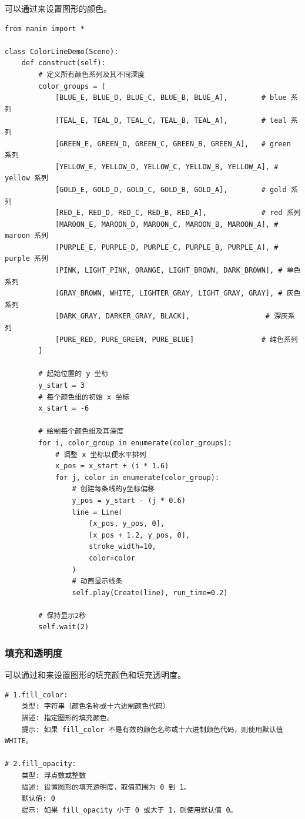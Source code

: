 可以通过来设置图形的颜色。

\begin{lstlisting}[style=pythonstyle]
from manim import *

class ColorLineDemo(Scene):
    def construct(self):
        # 定义所有颜色系列及其不同深度
        color_groups = [
            [BLUE_E, BLUE_D, BLUE_C, BLUE_B, BLUE_A],        # blue 系列
            [TEAL_E, TEAL_D, TEAL_C, TEAL_B, TEAL_A],        # teal 系列
            [GREEN_E, GREEN_D, GREEN_C, GREEN_B, GREEN_A],   # green 系列
            [YELLOW_E, YELLOW_D, YELLOW_C, YELLOW_B, YELLOW_A], # yellow 系列
            [GOLD_E, GOLD_D, GOLD_C, GOLD_B, GOLD_A],        # gold 系列
            [RED_E, RED_D, RED_C, RED_B, RED_A],             # red 系列
            [MAROON_E, MAROON_D, MAROON_C, MAROON_B, MAROON_A], # maroon 系列
            [PURPLE_E, PURPLE_D, PURPLE_C, PURPLE_B, PURPLE_A], # purple 系列
            [PINK, LIGHT_PINK, ORANGE, LIGHT_BROWN, DARK_BROWN], # 单色系列
            [GRAY_BROWN, WHITE, LIGHTER_GRAY, LIGHT_GRAY, GRAY], # 灰色系列
            [DARK_GRAY, DARKER_GRAY, BLACK],                  # 深灰系列
            [PURE_RED, PURE_GREEN, PURE_BLUE]                # 纯色系列
        ]

        # 起始位置的 y 坐标
        y_start = 3
        # 每个颜色组的初始 x 坐标
        x_start = -6

        # 绘制每个颜色组及其深度
        for i, color_group in enumerate(color_groups):
            # 调整 x 坐标以便水平排列
            x_pos = x_start + (i * 1.6)
            for j, color in enumerate(color_group):
                # 创建每条线的y坐标偏移
                y_pos = y_start - (j * 0.6)
                line = Line(
                    [x_pos, y_pos, 0],
                    [x_pos + 1.2, y_pos, 0],
                    stroke_width=10,
                    color=color
                )
                # 动画显示线条
                self.play(Create(line), run_time=0.2)

        # 保持显示2秒
        self.wait(2)
\end{lstlisting}

\subsubsection{填充和透明度}
\label{subsubsec:Manim基本图形-填充和透明度}
可以通过和来设置图形的填充颜色和填充透明度。
\begin{lstlisting}[style=demostyle,numbers=none]
# 1.fill_color:
    类型: 字符串（颜色名称或十六进制颜色代码）
    描述: 指定图形的填充颜色。
    提示: 如果 fill_color 不是有效的颜色名称或十六进制颜色代码，则使用默认值 WHITE。

# 2.fill_opacity:
    类型: 浮点数或整数
    描述: 设置图形的填充透明度，取值范围为 0 到 1。
    默认值: 0
    提示: 如果 fill_opacity 小于 0 或大于 1，则使用默认值 0。
\end{lstlisting}


